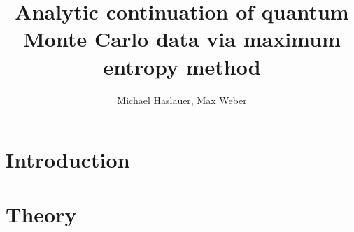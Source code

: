 \documentclass[10pt,letterpaper]{article}
\begin{document}
\title{Analytic continuation of quantum Monte Carlo data via maximum entropy method}
\author{Michael Haslauer, Max Weber}


\section{Introduction} %
\label{sec:introduction}

\section{Theory} %
\label{sec:theory}

\newpage
\end{document}
